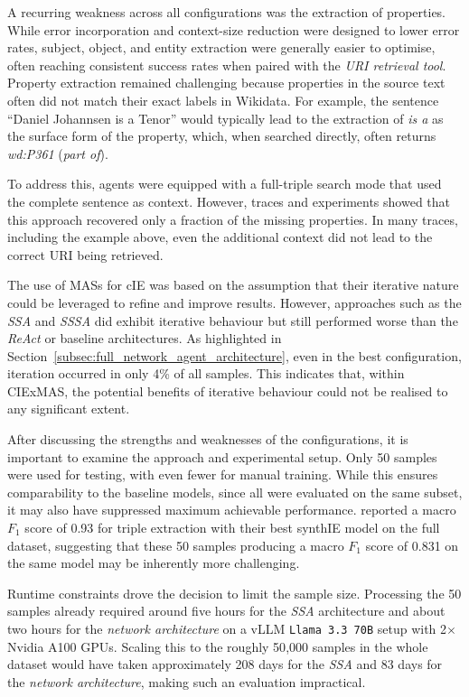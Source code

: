 \documentclass[a4paper,oneside,bibliography=totoc]{scrbook}
\begin{document}
A recurring weakness across all configurations was the extraction of properties. While error incorporation and context-size reduction were designed to lower error rates, subject, object, and entity extraction were generally easier to optimise, often reaching consistent success rates when paired with the \textit{\ac{URI} retrieval tool}. Property extraction remained challenging because properties in the source text often did not match their exact labels in Wikidata. For example, the sentence \enquote{Daniel Johannsen is a Tenor} would typically lead to the extraction of \textit{is a} as the surface form of the property, which, when searched directly, often returns \textit{wd:P361} (\textit{part of}).

To address this, agents were equipped with a full-triple search mode that used the complete sentence as context. However, traces and experiments showed that this approach recovered only a fraction of the missing properties. In many traces, including the example above, even the additional context did not lead to the correct \ac{URI} being retrieved.

The use of \acp{MAS} for \ac{cIE} was based on the assumption that their iterative nature could be leveraged to refine and improve results. However, approaches such as the \textit{\ac{SSA}} and \textit{\ac{SSSA}} did exhibit iterative behaviour but still performed worse than the \textit{\ac{ReAct}} or baseline architectures. As highlighted in Section~\ref{subsec:full_network_agent_architecture}, even in the best configuration, iteration occurred in only 4\% of all samples. This indicates that, within CIExMAS, the potential benefits of iterative behaviour could not be realised to any significant extent.

After discussing the strengths and weaknesses of the configurations, it is important to examine the approach and experimental setup. Only 50 samples were used for testing, with even fewer for manual training. While this ensures comparability to the baseline models, since all were evaluated on the same subset, it may also have suppressed maximum achievable performance. \citet{Josifoski2023} reported a macro $F_{1}$ score of 0.93 for triple extraction with their best synthIE model on the full dataset, suggesting that these 50 samples producing a macro $F_{1}$ score of 0.831 on the same model may be inherently more challenging.

Runtime constraints drove the decision to limit the sample size. Processing the 50 samples already required around five hours for the \textit{\ac{SSA}} architecture and about two hours for the \textit{network architecture} on a vLLM \texttt{Llama~3.3~70B} setup with 2$\times$Nvidia A100 GPUs. Scaling this to the roughly 50{,}000 samples in the whole dataset would have taken approximately 208 days for the \textit{\ac{SSA}} and 83 days for the \textit{network architecture}, making such an evaluation impractical.
\end{document}
